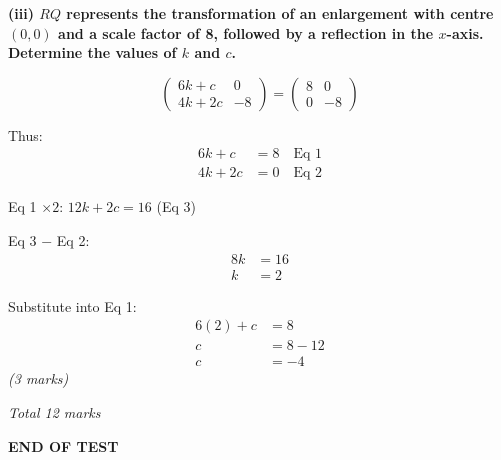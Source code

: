 \documentclass[12pt,a4paper]{article}
\newcommand{\subhead}[1]{\vspace{0.3em}\noindent\textbf{#1}\par}
\newcommand{\qmarks}[1]{\hfill\textit{(#1)}}
\begin{document}
\subhead{(iii) $RQ$ represents the transformation of an enlargement with centre $(0,0)$ and a scale factor of 8, followed by a reflection in the $x$-axis. Determine the values of $k$ and $c$.}
\[ \begin{pmatrix} 6k + c & 0 \\ 4k + 2c & -8 \end{pmatrix} = \begin{pmatrix} 8 & 0 \\ 0 & -8 \end{pmatrix} \]

Thus:
\begin{align*}
6k + c &= 8 \quad \text{Eq 1} \\
4k + 2c &= 0 \quad \text{Eq 2}
\end{align*}

Eq 1 $\times 2$: $12k + 2c = 16$ \quad (Eq 3)

Eq 3 $-$ Eq 2:
\begin{align*}
8k &= 16 \\
k &= 2
\end{align*}

Substitute into Eq 1:
\begin{align*}
6(2) + c &= 8 \\
c &= 8 - 12 \\
c &= -4
\end{align*}
\qmarks{3 marks}

\hfill\textit{Total 12 marks}

\vspace{2em}
\begin{center}
\textbf{END OF TEST}
\end{center}
\end{document}
